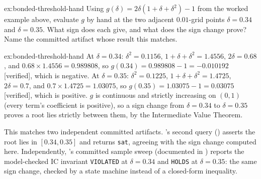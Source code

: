 \documentclass[11pt,a4paper]{article}
\theoremstyle{definition}
\theoremstyle{remark}
\begin{document}
\begin{pdexercise}[kind=Trace,rating=2]{ex:bonded-threshold-hand}
Using $g(\delta)=2\delta(1+\delta+\delta^2)-1$ from the worked example above, evaluate $g$ by hand at the two adjacent $0.01$-grid points $\delta=0.34$ and $\delta=0.35$. What sign does each give, and what does the sign change prove? Name the committed artifact whose result this matches.
\end{pdexercise}
\begin{pdsolution}{ex:bonded-threshold-hand}
At $\delta=0.34$: $\delta^2=0.1156$, $1+\delta+\delta^2=1.4556$, $2\delta=0.68$, and $0.68\times1.4556=0.989808$, so $g(0.34)=0.989808-1=-0.010192$ [verified], which is negative. At $\delta=0.35$: $\delta^2=0.1225$, $1+\delta+\delta^2=1.4725$, $2\delta=0.7$, and $0.7\times1.4725=1.03075$, so $g(0.35)=1.03075-1=0.03075$ [verified], which is positive. $g$ is continuous and strictly increasing on $(0,1)$ (every term's coefficient is positive), so a sign change from $\delta=0.34$ to $\delta=0.35$ proves a root lies strictly between them, by the Intermediate Value Theorem.

This matches two independent committed artifacts. 's second query () asserts the root lies in $[0.34, 0.35]$ and returns \texttt{sat}, agreeing with the sign change computed here. Independently, 's committed sample sweep (documented in ) reports the model-checked IC invariant \texttt{VIOLATED} at $\delta=0.34$ and \texttt{HOLDS} at $\delta=0.35$: the same sign change, checked by a state machine instead of a closed-form inequality.
\end{pdsolution}
\end{document}
